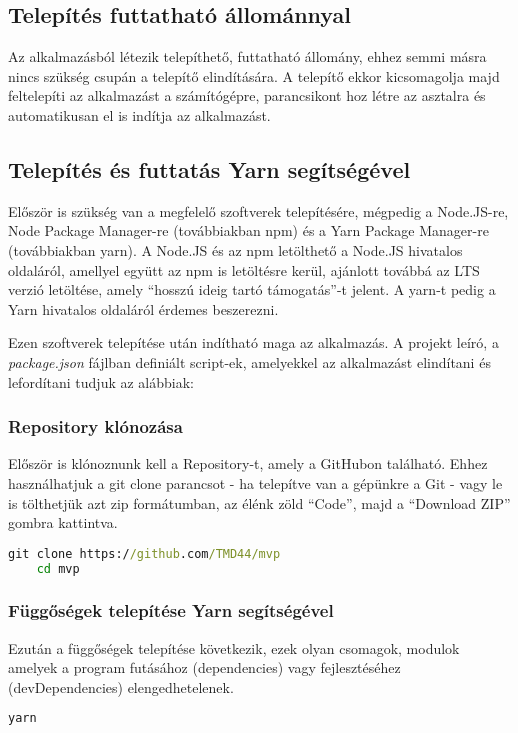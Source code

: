 \subsection{Telepítés futtatható állománnyal}
Az alkalmazásból létezik telepíthető, futtatható állomány, ehhez semmi másra nincs szükség csupán a telepítő elindítására. A telepítő ekkor kicsomagolja majd feltelepíti az alkalmazást a számítógépre, parancsikont hoz létre az asztalra és automatikusan el is indítja az alkalmazást.

\subsection{Telepítés és futtatás Yarn segítségével}
Először is szükség van a megfelelő szoftverek telepítésére, mégpedig a Node.JS-re, Node Package Manager-re (továbbiakban npm) és a Yarn Package Manager-re (továbbiakban yarn). A Node.JS és az npm letölthető a Node.JS hivatalos oldaláról\cite{node}, amellyel együtt az npm is letöltésre kerül, ajánlott továbbá az LTS verzió letöltése, amely ``hosszú ideig tartó támogatás''-t jelent. A yarn-t pedig a Yarn hivatalos oldaláról\cite{yarn} érdemes beszerezni.

Ezen szoftverek telepítése után indítható maga az alkalmazás. A projekt leíró, a {\it package.json} fájlban definiált script-ek, amelyekkel az alkalmazást elindítani és lefordítani tudjuk az alábbiak:

\subsubsection{Repository klónozása}
Először is klónoznunk kell a Repository-t, amely a GitHubon található. Ehhez használhatjuk a git clone parancsot - ha telepítve van a gépünkre a Git\cite{git} - vagy le is tölthetjük azt zip formátumban, az élénk zöld ``Code'', majd a ``Download ZIP'' gombra kattintva.
\begin{lstlisting}[language={cmd}, numbers={none}]
    git clone https://github.com/TMD44/mvp
    cd mvp
\end{lstlisting}

\subsubsection{Függőségek telepítése Yarn segítségével}
Ezután a függőségek telepítése következik, ezek olyan csomagok, modulok amelyek a program futásához (dependencies) vagy fejlesztéséhez (devDependencies) elengedhetelenek.
\begin{lstlisting}[language={cmd}, numbers={none}]
    yarn
\end{lstlisting}

